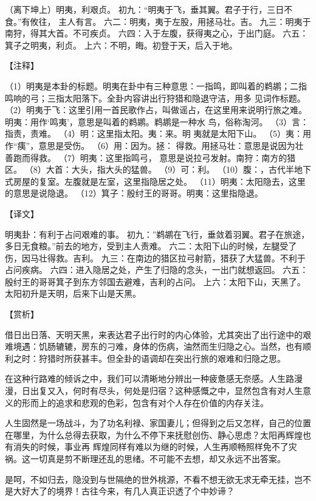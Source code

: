 \documentclass[a4paper,12pt,UTF8,twoside]{ctexbook}
\begin{document}
（离下坤上）明夷，利艰贞。
初九：“明夷于飞，垂其翼。君子于行，三日不食。”有攸往， 主人有言。
六二：明夷，夷于左股，用拯马壮。吉。
九三：明夷于南狩，得其大首。不可疾贞。
六四：入于左腹，获得夷之心，于出门庭。
六五：箕子之明夷，利贞。
上六：不明，晦。初登于天，后入于地。

【注释】

（1）明夷是本卦的标题。明夷在卦中有三种意思：一指鸣，即叫着的鹈鹕；二指鸣响的弓；三指太阳落下。全卦内容讲出行狩猎和隐退守洁，用多 见词作标题。
（2）明夷于飞：这里引用一首民歌作占，叫做谣占，在这里用来说明行旅之难。明夷：用作‘鸣夷’，意思是叫着的鹈鹕。鹈鹕是一种水 鸟，俗称淘河。
（3）言：指责，责难。
（4）明：这里指太阳。夷：来。明 夷就是太阳下山。
（5）夷：用作“痍”，意思是受伤。
（6）用：因为。拯： 得救。用拯马壮：意思是说因为壮善跑而得救。
（7）明夷：这里指鸣弓， 意思是说拉弓发射。南狩：南方的猎区。
（8）大首：大头，指大头的猛兽。
（9）可：利。
（10）腹：，古代半地下式房屋的复室。左腹就是左室，这里指隐居之处。
（11）明夷：太阳隐去，这里的意思是说隐退。
（12）箕子：殷纣王的哥哥。明夷：这里指隐退。

【译文】

明夷卦：有利于占问艰难的事。
初九：”鹈鹕在飞行，垂敛着羽翼。君子在旅途，多日无食粮。”前去的地方，受到主人责难。
六二：太阳下山的时候，左腿受了伤，因马壮得救。吉利。
九三：在南边的猎区拉弓射箭，猎获了大猛兽。不利于占问疾病。
六四：进入隐居之处，产生了归隐的念头，一出门就想返回。
六五：殷纣王的哥哥箕子到东方邻国去避难，吉利的占问。
上六：太阳下山，天黑了。太阳初升是天明，后来下山是天黑。

【赏析】

借日出日落、天明天黑，来表达君子出行时的内心体验，尤其突出了出行途中的艰难境遇：饥肠辘辘，房东的刁难，身体的伤病，油然而生归隐之心。当然，也有顺利之时：狩猎时所获甚丰。但全卦的语调却在突出行旅的艰难和归隐之思。

在这种行路难的倾诉之中，我们可以清晰地分辨出一种疲惫感无奈感。人生路漫漫，日出复又入，何时有尽头，何处是归宿？这种感慨之中，显然包含有对人生意义的形而上的追求和悲观的色彩，包含有对个人存在价值的内存关注。

人生固然是一场战斗，为了功名利禄、家国妻儿；但得到之后又怎样，自己的位置在哪里，为什么总得去获取，为什么不停下来抚慰创伤、静心思虑？太阳再辉煌也有消失的时候，事业再 辉煌同样有难以为继的时候，人生再顺畅照样免不了灾祸。这一切真是剪不断理还乱的思绪。不可能不去想，却又永远不出答案。

是呵，不如归去，隐没到与世隔绝的世外桃源，不看不想无欲无求无牵无挂，岂不是大好大了的境界！古往今来，有几人真正识透了个中妙谛？
\end{document}

